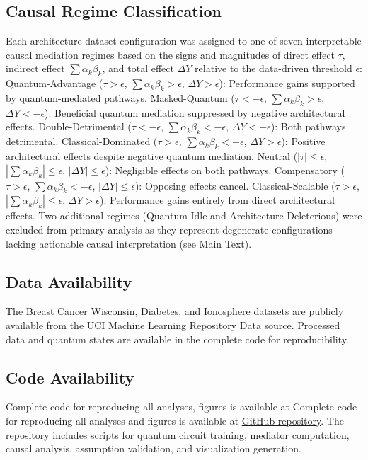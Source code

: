 \documentclass[
    reprint,
    amsmath, amssymb,
    aps,
    floatfix,
    nofootinbib
]{revtex4-1}
\begin{document}
\subsection*{Causal Regime Classification}

Each architecture-dataset configuration was assigned to one of seven interpretable causal mediation regimes based on the signs and magnitudes of direct effect $\tau$, indirect effect $\sum \alpha_k \beta_k$, and total effect $\Delta Y$ relative to the data-driven threshold $\epsilon$:
Quantum-Advantage ($\tau > \epsilon$, $\sum \alpha_k \beta_k > \epsilon$, $\Delta Y > \epsilon$): Performance gains supported by quantum-mediated pathways. 
Masked-Quantum ($\tau < -\epsilon$, $\sum \alpha_k \beta_k > \epsilon$, $\Delta Y < -\epsilon$): Beneficial quantum mediation suppressed by negative architectural effects.
Double-Detrimental ($\tau < -\epsilon$, $\sum \alpha_k \beta_k < -\epsilon$, $\Delta Y < -\epsilon$): Both pathways detrimental.
Classical-Dominated ($\tau > \epsilon$, $\sum \alpha_k \beta_k < -\epsilon$, $\Delta Y > \epsilon$): Positive architectural effects despite negative quantum mediation.
Neutral ($|\tau| \leq \epsilon$, $|\sum \alpha_k \beta_k| \leq \epsilon$, $|\Delta Y| \leq \epsilon$): Negligible effects on both pathways.
Compensatory ($\tau > \epsilon$, $\sum \alpha_k \beta_k < -\epsilon$, $|\Delta Y| \leq \epsilon$): Opposing effects cancel.
Classical-Scalable ($\tau > \epsilon$, $|\sum \alpha_k \beta_k| \leq \epsilon$, $\Delta Y > \epsilon$): Performance gains entirely from direct architectural effects.
Two additional regimes (Quantum-Idle and Architecture-Deleterious) were excluded from primary analysis as they represent degenerate configurations lacking actionable causal interpretation (see Main Text).

\subsection*{Data Availability}
The Breast Cancer Wisconsin, Diabetes, and Ionosphere datasets are publicly available from the UCI Machine Learning Repository \href{https://archive.ics.uci.edu/ml/}{Data source}. Processed data and quantum states are available in the complete code for reproducibility.

\subsection*{Code Availability}
Complete code for reproducing all analyses, figures is available at Complete code for reproducing all analyses and figures is available at 
\href{https://github.com/Cyrillekesiku/How-Quantum-Circuits-Actually-Learn-A-Causal-Identification-of-Genuine-Quantum-Contributions}{GitHub repository}. The repository includes scripts for quantum circuit training, mediator computation, causal analysis, assumption validation, and visualization generation.
\end{document}
